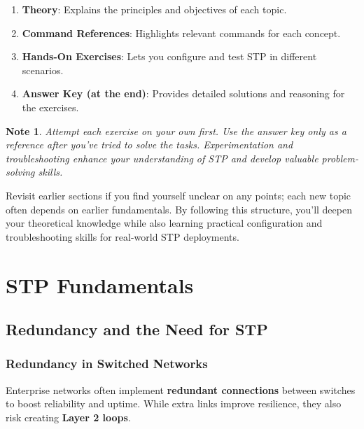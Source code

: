 \documentclass[a4paper]{report}
\newtheorem*{noteenv}{Note}
\begin{document}
\begin{enumerate}
  \item \textbf{Theory}: Explains the principles and objectives of each topic.
  \item \textbf{Command References}: Highlights relevant commands for each concept.
  \item \textbf{Hands-On Exercises}: Lets you configure and test STP in different scenarios.
  \item \textbf{Answer Key (at the end)}: Provides detailed solutions and reasoning for the exercises.
\end{enumerate}

\begin{noteenv}
Attempt each exercise on your own first. Use the answer key only as a reference after you’ve tried to solve the tasks. Experimentation and troubleshooting enhance your understanding of STP and develop valuable problem-solving skills.
\end{noteenv}

Revisit earlier sections if you find yourself unclear on any points; each new topic often depends on earlier fundamentals. By following this structure, you’ll deepen your theoretical knowledge while also learning practical configuration and troubleshooting skills for real-world STP deployments.

\chapter{STP Fundamentals}

\section{Redundancy and the Need for STP}
\subsection{Redundancy in Switched Networks}
Enterprise networks often implement \textbf{redundant connections} between switches to boost reliability and uptime. While extra links improve resilience, they also risk creating \textbf{Layer 2 loops}.
\end{document}
